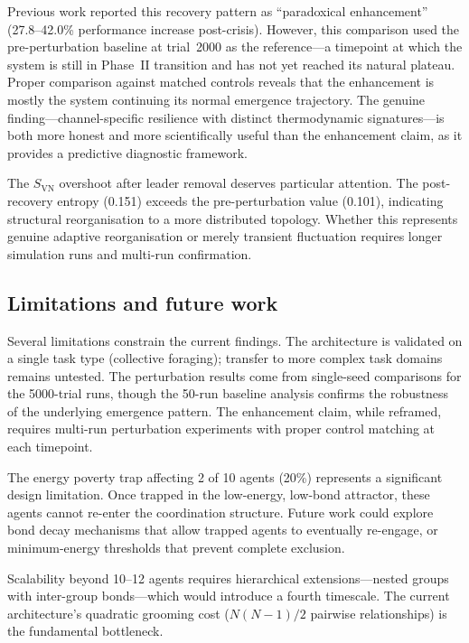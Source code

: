\documentclass[12pt]{article}
\begin{document}
Previous work reported this recovery pattern as ``paradoxical enhancement'' (27.8--42.0\% performance increase post-crisis). However, this comparison used the pre-perturbation baseline at trial~2000 as the reference---a timepoint at which the system is still in Phase~II transition and has not yet reached its natural plateau. Proper comparison against matched controls reveals that the enhancement is mostly the system continuing its normal emergence trajectory. The genuine finding---channel-specific resilience with distinct thermodynamic signatures---is both more honest and more scientifically useful than the enhancement claim, as it provides a predictive diagnostic framework.

The $S_\mathrm{VN}$ overshoot after leader removal deserves particular attention. The post-recovery entropy (0.151) exceeds the pre-perturbation value (0.101), indicating structural reorganisation to a more distributed topology. Whether this represents genuine adaptive reorganisation or merely transient fluctuation requires longer simulation runs and multi-run confirmation.


\subsection{Limitations and future work}
\label{sec:limitations}

Several limitations constrain the current findings. The architecture is validated on a single task type (collective foraging); transfer to more complex task domains remains untested. The perturbation results come from single-seed comparisons for the 5000-trial runs, though the 50-run baseline analysis confirms the robustness of the underlying emergence pattern. The enhancement claim, while reframed, requires multi-run perturbation experiments with proper control matching at each timepoint.

The energy poverty trap affecting 2 of 10 agents (20\%) represents a significant design limitation. Once trapped in the low-energy, low-bond attractor, these agents cannot re-enter the coordination structure. Future work could explore bond decay mechanisms that allow trapped agents to eventually re-engage, or minimum-energy thresholds that prevent complete exclusion.

Scalability beyond 10--12 agents requires hierarchical extensions---nested groups with inter-group bonds---which would introduce a fourth timescale. The current architecture's quadratic grooming cost ($N(N-1)/2$ pairwise relationships) is the fundamental bottleneck.
\end{document}
